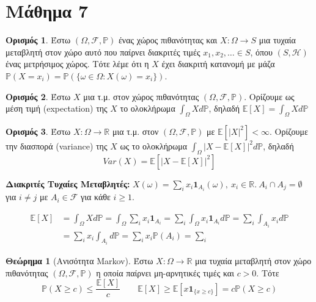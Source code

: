 \documentclass[12pt,a4paper]{article}
\theoremstyle{definition}
\numberwithin{equation}{section}
\newtheorem{orismos}{Ορισμός}
\newtheorem{theorima}{Θεώρημα}
\begin{document}
{\section{Μάθημα 7}
\label{sec:orge386496}

\begin{orismos}
Έστω $(\Omega,\mathcal{F},\mathbb{P})$ ένας χώρος πιθανότητας και $X:\Omega \rightarrow S$ μια τυχαία μεταβλητή στον χώρο αυτό που παίρνει διακριτές τιμές $x_1, x_2, \dots \in S$, όπου $(S,\mathcal{H})$ ένας μετρήσιμος χώρος. Τότε λέμε ότι η $X$ έχει διακριτή κατανομή με μάζα $\mathbb{P}(X=x_i) = \mathbb{P}(\{\omega \in \Omega : X(\omega) = x_i\})$.
\end{orismos}

\begin{orismos}
Έστω $X$ μια τ.μ. στον χώρος πιθανότητας $(\Omega, \mathcal{F}, \mathbb{P})$. Ορίζουμε ως μέση τιμή (expectation) της $X$ το ολοκλήρωμα $\int_\Omega X d\mathbb{P}$, δηλαδή $\mathbb{E}[X] = \int_\Omega X d\mathbb{P}$
\end{orismos}

\begin{orismos}
Έστω $X:\Omega \rightarrow \mathbb{R}$ μια τ.μ. στον $(\Omega, \mathcal{F},\mathbb{P})$ με $\mathbb{E}[|X|^2]<\infty$. Ορίζουμε την διασπορά (variance) της $X$ ως το ολοκλήρωμα $\int_\Omega |X-\mathbb{E}[X]|^2 d\mathbb{P}$, δηλαδή
$$ Var(X) = \mathbb{E}[|X-\mathbb{E}[X]|^2] $$
\end{orismos}

\textbf{Διακριτές Τυχαίες Μεταβλητές:} \(X(\omega) = \sum_{i}x_i\mathbf{1}_{A_i}(\omega), \: x_i \in \mathbb{R}.\: A_i \cap A_j = \emptyset\) για \(i\neq j\) με \(A_i \in \mathcal{F}\) για κάθε \(i\geq 1\).

\begin{align*}
\mathbb{E}[X] &= \int_\Omega X d\mathbb{P} = \int_\Omega \sum_i x_i \mathbf{1}_{A_i} = \sum_i \int_\Omega x_i \mathbf{1}_{A_i} d\mathbb{P} =\sum_i \int_{A_i} x_i d\mathbb{P}\\
&= \sum_i x_i \int_{A_i} d\mathbb{P} = \sum_i x_i \mathbb{P}(A_i) = \sum_i
\end{align*}

\begin{theorima}[Ανισότητα Markov]
 Έστω $X:\Omega \rightarrow \mathbb{R}$ μια τυχαία μεταβλητή στον χώρο πιθανότητας $(\Omega,\mathcal{F},\mathbb{P})$ η οποία παίρνει μη-αρνητικές τιμές και $c>0$. Τότε
$$ \mathbb{P}(X\geq c) \leq \frac{\mathbb{E}[X]}{c}  \qquad \mathbb{E}[X] \geq \mathbb{E}[x\mathbf{1}_{\{x \geq c\}}] = c \mathbb{P}(X\geq c)$$
\end{theorima}

}
\end{document}
